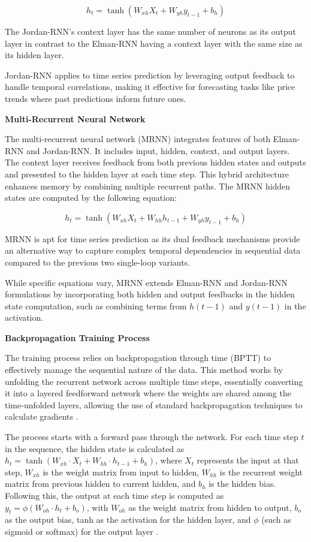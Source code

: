 \documentclass[conference, 10pt]{IEEEtran}
\begin{document}
$$h_t = \tanh(W_{xh}X_t + W_{yh}y_{t-1} + b_h)$$

The Jordan-RNN's context layer has the same number of neurons as its output layer in contrast to the Elman-RNN having a
context layer with the same size as its hidden layer.

Jordan-RNN applies to time series prediction by leveraging output feedback to handle temporal correlations, making it
effective for forecasting tasks like price trends where past predictions inform future ones.

\textbf{Multi-Recurrent Neural Network }

The multi-recurrent neural network (MRNN) integrates features of both Elman-RNN and Jordan-RNN. It includes input,
hidden, context, and output layers. The context layer receives feedback from both previous hidden states and
outputs and presented to the hidden layer at each time step. This hybrid architecture enhances memory by combining multiple
recurrent paths. The MRNN hidden states are computed by the following equation: 

$$h_t = \tanh(W_{xh}X_t + W_{hh}h_{t-1} + W_{yh}y_{t-1} + b_h)$$

MRNN is apt for time series prediction as its dual feedback mechanisms provide an alternative way to capture complex
temporal dependencies in sequential data compared to the previous two single-loop variants.

While specific equations vary, MRNN extends Elman-RNN and Jordan-RNN formulations by incorporating both hidden and
output feedbacks in the hidden state computation, such as combining terms from \( h(t-1) \) and \( y(t-1) \) in the
activation.

\textbf{Backpropagation Training Process} 

The training process relies on backpropagation through time (BPTT) to effectively manage the sequential nature of the
data. This method works by unfolding the recurrent network across multiple time steps, essentially converting it into a
layered feedforward network where the weights are shared among the time-unfolded layers, allowing the use of standard
backpropagation techniques to calculate gradients \cite{quarkmlBackpropagationThrough}.

The process starts with a forward pass through the network. For each time step $t$ in the sequence, the hidden state is
calculated as \( h_t = \tanh(W_{xh} \cdot X_t + W_{hh} \cdot h_{t-1} + b_h) \), where \( X_t \) represents the input at
that step, \( W_{xh} \) is the weight matrix from input to hidden, \( W_{hh} \) is the recurrent weight matrix from
previous hidden to current hidden, and \( b_h \) is the hidden bias. Following this, the output at each time step is
computed as \( y_t = \phi(W_{oh} \cdot h_t + b_o) \), with \( W_{oh} \) as the weight matrix from hidden to output, \(
b_o \) as the output bias, tanh as the activation for the hidden layer, and \( \phi \) (such as sigmoid or softmax) for
the output layer \cite{quarkmlBackpropagationThrough}.
\end{document}
